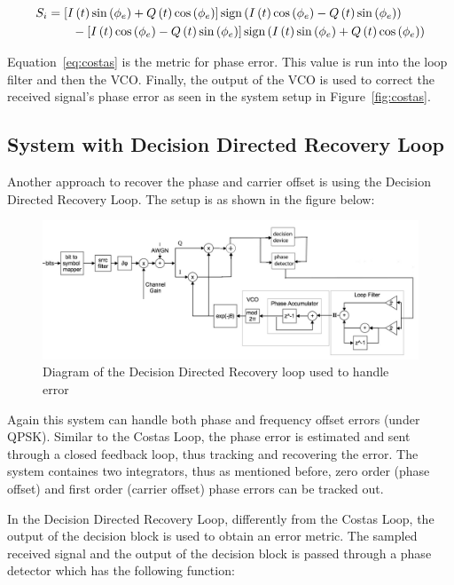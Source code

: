 \documentclass[]{article}
\newcommand{\rom}[1]{\uppercase\expandafter{\romannumeral#1}}
\begin{document}
\begin{align}
  \label{eq:costas}
  S_{\rom{1}} &= \left[I\left(t\right)\sin\left(\phi_e\right)+Q\left(t\right)\cos\left(\phi_e\right)\right]\text{sign}\left(I\left(t\right)\cos\left(\phi_e\right)- Q\left(t\right)\sin\left(\phi_e\right)\right)\nonumber \\
  &\qquad {} - \left[I\left(t\right)\cos\left(\phi_e\right)-Q\left(t\right)\sin\left(\phi_e\right)\right]\text{sign}\left(I\left(t\right)\sin\left(\phi_e\right)+Q\left(t\right)\cos\left(\phi_e\right)\right)
  \end{align}


Equation~\ref{eq:costas} is the metric for phase error.  This value is run into the loop filter and then the VCO.  Finally, the output of the VCO is used to correct the received signal's phase error as seen in the system setup in Figure~\ref{fig:costas}.

\newpage
\subsection{System with Decision Directed Recovery Loop}
Another approach to recover the phase and carrier offset is using the Decision Directed Recovery Loop. The setup is as shown in the figure below:
\begin{figure}[H]
\centering
\includegraphics[width=\textwidth]{ddr_diagram.jpg}
\caption{Diagram of the Decision Directed Recovery loop used to handle error\label{fig:ddr}}
\end{figure}

Again this system can handle both phase and frequency offset errors (under QPSK). Similar to the Costas Loop, the phase error is estimated and sent through a closed feedback loop, thus tracking and recovering the error. The system containes two integrators, thus as mentioned before, zero order (phase offset) and first order (carrier offset) phase errors can be tracked out. 

In the Decision Directed Recovery Loop, differently from the Costas Loop, the output of the decision block is used to obtain an error metric. The sampled received signal and the output of the decision block is passed through a phase detector which has the following function:\\
\end{document}
